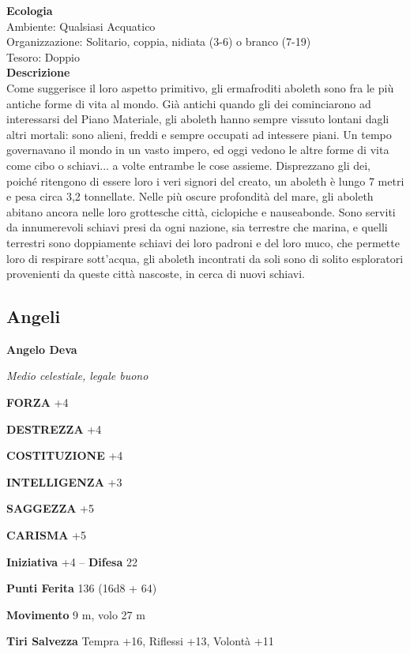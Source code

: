 \begin{multicols}{2}
\textbf{Ecologia}\\
Ambiente: Qualsiasi Acquatico\\
Organizzazione: Solitario, coppia, nidiata (3-6) o branco (7-19)\\
Tesoro: Doppio\\
\textbf{Descrizione}\\
Come suggerisce il loro aspetto primitivo, gli ermafroditi aboleth sono fra le più antiche forme di vita al mondo. Già antichi quando gli dei cominciarono ad interessarsi del Piano Materiale, gli aboleth hanno sempre vissuto lontani dagli altri mortali: sono alieni, freddi e sempre occupati ad intessere piani. Un tempo governavano il mondo in un vasto impero, ed oggi vedono le altre forme di vita come cibo o schiavi... a volte entrambe le cose assieme. Disprezzano gli dei, poiché ritengono di essere loro i veri signori del creato, un aboleth è lungo 7 metri e pesa circa 3,2 tonnellate. Nelle più oscure profondità del mare, gli aboleth abitano ancora nelle loro grottesche città, ciclopiche e nauseabonde. Sono serviti da innumerevoli schiavi presi da ogni nazione, sia terrestre che marina, e quelli terrestri sono doppiamente schiavi dei loro padroni e del loro muco, che permette loro di respirare sott'acqua, gli aboleth incontrati da soli sono di solito esploratori provenienti da queste città nascoste, in cerca di nuovi schiavi.\\



\subsection{Angeli}

\medskip{}\textbf{Angelo Deva}

\emph{Medio celestiale, legale buono}

\textbf{FORZA} +4

\textbf{DESTREZZA} +4

\textbf{COSTITUZIONE} +4

\textbf{INTELLIGENZA} +3

\textbf{SAGGEZZA} +5

\textbf{CARISMA} +5

\textbf{Iniziativa} +4 -- \textbf{Difesa} 22

\textbf{Punti Ferita} 136 (16d8 + 64)

\textbf{Movimento} 9 m, volo 27 m

\textbf{Tiri Salvezza} Tempra +16, Riflessi +13, Volontà +11


\end{multicols}
